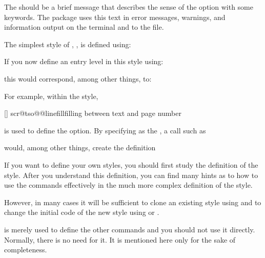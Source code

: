 The  should be a brief message that describes the sense
of the option with some keywords. The  package uses this text
in error messages, warnings, and information output on the terminal and to the
 file.

The simplest style of , , is defined
using:
\begin{lstcode}
\end{lstcode}
If you now define an entry level  in this style using:
\begin{lstcode}
\end{lstcode}
this would correspond, among other things, to:
\begin{lstcode}
  \def\dummytocdepth{1}
  \def\l@dummy#1#2{}
\end{lstcode}

For example, within the  style,
\begin{lstcode}
  [\TOCLineLeaderFill]%
  {scr@tso@}{@linefill}{filling between text and page number}%
\end{lstcode}
is used to define the  option. By specifying 
 as the ,
a call such as
\begin{lstcode}
\end{lstcode}
would, among other things, create the definition
\begin{lstcode}
  \def\scr@tso@part@linefill{\TOCLineLeaderFill}
\end{lstcode}

If you want to define your own styles, you should first study the definition
of the  style. After you understand this definition, you
can find many hints as to how to use the commands effectively in the much more
complex definition of the  style.

However, in many cases it will be sufficient to clone an existing style using
 and to change the initial code of
the new style using  or
.

 is merely used to define the other commands and
you should not use it directly. Normally, there is no need for it. It is
mentioned here only for the sake of completeness.%
\EndIndexGroup


